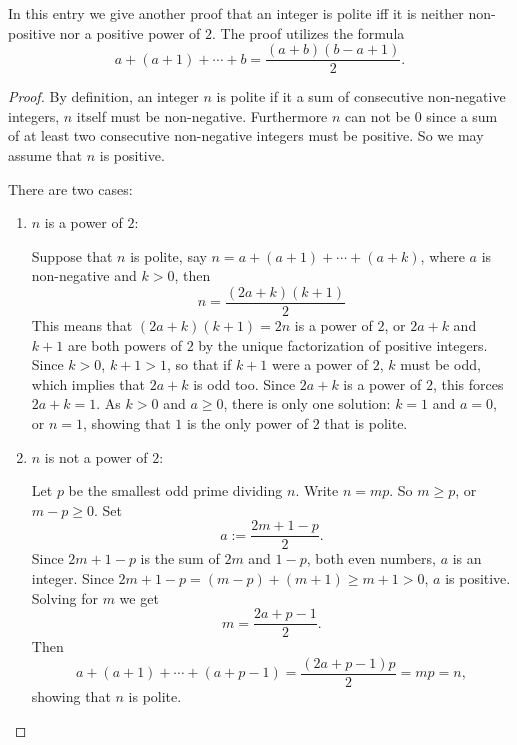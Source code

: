 \documentclass[12pt]{article}
\begin{document}
In this entry we give another proof that an integer is polite iff it is neither non-positive nor a positive power of $2$.  The proof utilizes the formula $$a+(a+1)+\cdots + b = \frac{(a+b)(b-a+1)}{2}.$$

\begin{proof}
By definition, an integer $n$ is polite if it a sum of consecutive non-negative integers, $n$ itself must be non-negative.  Furthermore $n$ can not be $0$ since a sum of at least two consecutive non-negative integers must be positive.  So we may assume that $n$ is positive.

There are two cases:
\begin{enumerate}
\item $n$ is a power of $2$:

Suppose that $n$ is polite, say $n=a+(a+1)+\cdots + (a+k)$, where $a$ is non-negative and $k>0$, then $$n=\frac{(2a+k)(k+1)}{2}$$
This means that $(2a+k)(k+1)=2n$ is a power of $2$, or $2a+k$ and $k+1$ are both powers of $2$ by the unique factorization of positive integers.  Since $k>0$, $k+1>1$, so that if $k+1$ were a power of $2$, $k$ must be odd, which implies that $2a+k$ is odd too.  Since  $2a+k$ is a power of $2$, this forces $2a+k=1$.  As $k>0$ and $a\ge 0$, there is only one solution: $k=1$ and $a=0$, or $n=1$, showing that $1$ is the only power of $2$ that is polite.

\item $n$ is not a power of $2$:

Let $p$ be the smallest odd prime dividing $n$.  Write $n=mp$.  So $m\ge p$, or $m-p\ge 0$.  Set $$a:=\frac{2m+1-p}{2}.$$  Since $2m+1-p$ is the sum of $2m$ and $1-p$, both even numbers, $a$ is an integer.  Since $2m+1-p=(m-p)+(m+1)\ge m+1>0$, $a$ is positive.  Solving for $m$ we get $$m=\frac{2a+p-1}{2}.$$
Then $$a+(a+1)+\cdots + (a+p-1) = \frac{(2a+p-1)p}{2}=mp=n,$$ showing that $n$ is polite.
\end{enumerate}

\end{proof}
\end{document}
